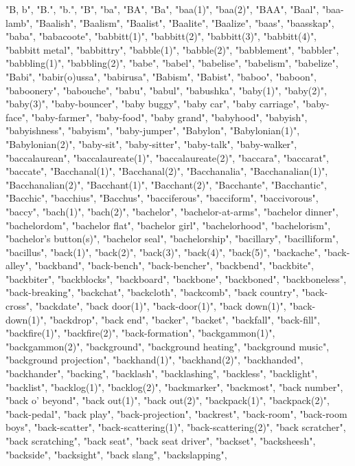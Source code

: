 "B, b",
"B.",
"b.",
"B",
"ba",
"BA",
"Ba",
"baa(1)",
"baa(2)",
"BAA",
"Baal",
"baa-lamb",
"Baalish",
"Baalism",
"Baalist",
"Baalite",
"Baalize",
"baas",
"baasskap",
"baba",
"babacoote",
"babbitt(1)",
"babbitt(2)",
"babbitt(3)",
"babbitt(4)",
"babbitt metal",
"babbittry",
"babble(1)",
"babble(2)",
"babblement",
"babbler",
"babbling(1)",
"babbling(2)",
"babe",
"babel",
"babelise",
"babelism",
"babelize",
"Babi",
"babir(o)ussa",
"babirusa",
"Babism",
"Babist",
"baboo",
"baboon",
"baboonery",
"babouche",
"babu",
"babul",
"babushka",
"baby(1)",
"baby(2)",
"baby(3)",
"baby-bouncer",
"baby buggy",
"baby car",
"baby carriage",
"baby-face",
"baby-farmer",
"baby-food",
"baby grand",
"babyhood",
"babyish",
"babyishness",
"babyism",
"baby-jumper",
"Babylon",
"Babylonian(1)",
"Babylonian(2)",
"baby-sit",
"baby-sitter",
"baby-talk",
"baby-walker",
"baccalaurean",
"baccalaureate(1)",
"baccalaureate(2)",
"baccara",
"baccarat",
"baccate",
"Bacchanal(1)",
"Bacchanal(2)",
"Bacchanalia",
"Bacchanalian(1)",
"Bacchanalian(2)",
"Bacchant(1)",
"Bacchant(2)",
"Bacchante",
"Bacchantic",
"Bacchic",
"bacchius",
"Bacchus",
"bacciferous",
"bacciform",
"baccivorous",
"baccy",
"bach(1)",
"bach(2)",
"bachelor",
"bachelor-at-arms",
"bachelor dinner",
"bachelordom",
"bachelor flat",
"bachelor girl",
"bachelorhood",
"bachelorism",
"bachelor's button(s)",
"bachelor seal",
"bachelorship",
"bacillary",
"bacilliform",
"bacillus",
"back(1)",
"back(2)",
"back(3)",
"back(4)",
"back(5)",
"backache",
"back-alley",
"backband",
"back-bench",
"back-bencher",
"backbend",
"backbite",
"backbiter",
"backblocks",
"backboard",
"backbone",
"backboned",
"backboneless",
"back-breaking",
"backchat",
"backcloth",
"backcomb",
"back country",
"back-cross",
"backdate",
"back door(1)",
"back-door(1)",
"back down(1)",
"back-down(1)",
"backdrop",
"back end",
"backer",
"backet",
"backfall",
"back-fill",
"backfire(1)",
"backfire(2)",
"back-formation",
"backgammon(1)",
"backgammon(2)",
"background",
"background heating",
"background music",
"background projection",
"backhand(1)",
"backhand(2)",
"backhanded",
"backhander",
"backing",
"backlash",
"backlashing",
"backless",
"backlight",
"backlist",
"backlog(1)",
"backlog(2)",
"backmarker",
"backmost",
"back number",
"back o' beyond",
"back out(1)",
"back out(2)",
"backpack(1)",
"backpack(2)",
"back-pedal",
"back play",
"back-projection",
"backrest",
"back-room",
"back-room boys",
"back-scatter",
"back-scattering(1)",
"back-scattering(2)",
"back scratcher",
"back scratching",
"back seat",
"back seat driver",
"backset",
"backsheesh",
"backside",
"backsight",
"back slang",
"backslapping",
